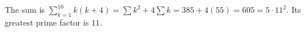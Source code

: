 The sum is $\sum_{k=1}^{10}k(k+4)=\sum k^2+4\sum k=385+4(55)=605=5\cdot 11^2$. Its greatest prime factor is $\boxed{11}$.
